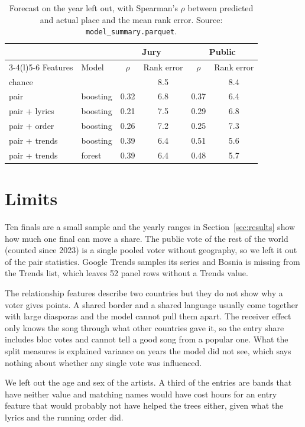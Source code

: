 \documentclass[a4paper,10pt]{article}
\begin{document}
\begin{table}[t]
\centering\small
\begin{tabular}{@{}llcccc@{}}
\toprule
 & & \multicolumn{2}{c}{Jury} & \multicolumn{2}{c}{Public}\\
\cmidrule(r){3-4}\cmidrule(l){5-6}
Features & Model & $\rho$ & Rank error & $\rho$ & Rank error\\
\midrule
chance & & & 8.5 & & 8.4\\
pair & boosting & 0.32 & 6.8 & 0.37 & 6.4\\
pair + lyrics & boosting & 0.21 & 7.5 & 0.29 & 6.8\\
pair + order & boosting & 0.26 & 7.2 & 0.25 & 7.3\\
pair + trends & boosting & 0.39 & 6.4 & 0.51 & 5.6\\
pair + trends & forest & 0.39 & 6.4 & 0.48 & 5.7\\
\bottomrule
\end{tabular}
\caption{Forecast on the year left out, with Spearman's $\rho$ between predicted and actual place and the mean rank error. Source: \texttt{model\_summary.parquet}.}
\label{tab:forecast}
\end{table}

\section{Limits}

Ten finals are a small sample and the yearly ranges in Section~\ref{sec:results} show how much one final can move a share.
The public vote of the rest of the world (counted since 2023) is a single pooled voter without geography, so we left it out of the pair statistics.
Google Trends samples its series and Bosnia is missing from the Trends list, which leaves 52 panel rows without a Trends value.

The relationship features describe two countries but they do not show why a voter gives points.
A shared border and a shared language usually come together with large diasporas and the model cannot pull them apart.
The receiver effect only knows the song through what other countries gave it, so the entry share includes bloc votes and cannot tell a good song from a popular one.
What the split measures is explained variance on years the model did not see, which says nothing about whether any single vote was influenced.

We left out the age and sex of the artists.
A third of the entries are bands that have neither value and matching names would have cost hours for an entry feature that would probably not have helped the trees either, given what the lyrics and the running order did.
\end{document}
